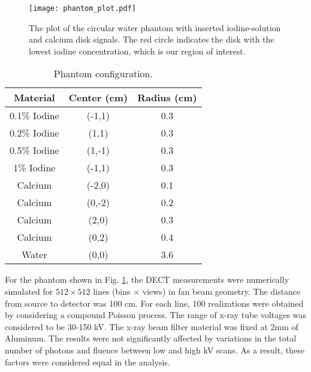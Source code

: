 \documentclass[12pt,twoside]{article}   %
\begin{document}
\begin{figure}[H]
\centering
\texttt{[image: phantom\_plot.pdf]}
\caption{The plot of the circular water phantom with inserted iodine-solution and calcium disk signals. The red circle indicates the disk with the lowest iodine concentration, which is our region of interest.}
\label{fig:phantom}
\end{figure}
\vspace{2em}
\begin{table}[htbp]
\centering
\begin{tabular}{|c|c|c|}
\hline
\multicolumn{1}{|c|}{Material} & Center (cm) & Radius (cm)   \\ \hline
0.1\% Iodine                   & (-1,1)      & 0.3           \\ \hline
0.2\% Iodine                   & (1,1)       & 0.3           \\ \hline
0.5\% Iodine                   & (1,-1)      & 0.3           \\ \hline
1\% Iodine                     & (-1,1)      & 0.3           \\ \hline
Calcium                        & (-2,0)      & 0.1           \\ \hline
Calcium                        & (0,-2)      & 0.2           \\ \hline
Calcium                        & (2,0)       & 0.3           \\ \hline
Calcium                        & (0,2)       & 0.4           \\ \hline
Water                          & (0,0)       & 3.6           \\ \hline
\end{tabular}
\caption{Phantom configuration.}
\label{t:phantom}
\end{table}

For the phantom shown in Fig. \ref{fig:phantom}, the DECT measurements were numerically simulated for $512 \times 512$ lines (bins $\times$ views) in fan beam geometry. The distance from source to detector was 100 cm. For each line, 100 realizations were obtained by considering a compound Poisson process\cite{Whiting2002}. The range of x-ray tube voltages was considered to be 30-150 kV. The x-ray beam filter material was fixed at 2mm of Aluminum. The results were not significantly affected by variations in the total number of photons and fluence between low and high kV scans. As a result, these factors were considered equal in the analysis.
\end{document}
